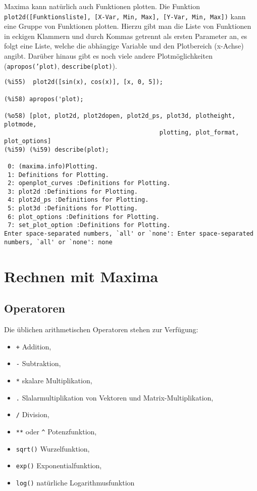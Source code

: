 \documentclass[ngerman,12pt]{scrartcl}
\begin{document}
Maxima kann natürlich auch Funktionen plotten. Die Funktion
\texttt{plot2d([Funktionsliste], [X-Var, Min, Max], [Y-Var, Min,  Max])}
kann eine Gruppe von Funktionen plotten. Hierzu gibt man die
Liste von Funktionen in eckigen Klammern und durch Kommas getrennt als
ersten Parameter an, es folgt eine Liste, welche die abhängige
Variable und den Plotbereich (x-Achse) angibt. Darüber hinaus gibt es
noch viele andere Plotmöglichkeiten (\texttt{apropos('plot)},
\texttt{describe(plot)}).

\begin{verbatim}
(%i55)  plot2d([sin(x), cos(x)], [x, 0, 5]);

(%i58) apropos('plot);

(%o58) [plot, plot2d, plot2dopen, plot2d_ps, plot3d, plotheight, plotmode,
                                           plotting, plot_format, plot_options]
(%i59) (%i59) describe(plot);

 0: (maxima.info)Plotting.
 1: Definitions for Plotting.
 2: openplot_curves :Definitions for Plotting.
 3: plot2d :Definitions for Plotting.
 4: plot2d_ps :Definitions for Plotting.
 5: plot3d :Definitions for Plotting.
 6: plot_options :Definitions for Plotting.
 7: set_plot_option :Definitions for Plotting.
Enter space-separated numbers, `all' or `none': Enter space-separated numbers, `all' or `none': none
\end{verbatim}

\section{Rechnen mit Maxima}

\subsection{Operatoren}

Die üblichen arithmetischen Operatoren stehen zur Verfügung:

\begin{itemize}
\item \texttt{+}  Addition,
\item \texttt{-} Subtraktion,
\item \texttt{*} skalare Multiplikation,
\item \texttt{.} Slalarmultiplikation von Vektoren und Matrix-Multiplikation,
\item \texttt{/} Division,
\item \texttt{**} oder \texttt{\^} Potenzfunktion,
\item \texttt{sqrt()} Wurzelfunktion,
\item \texttt{exp()} Exponentialfunktion,
\item \texttt{log()} natürliche Logarithmusfunktion
\end{itemize}
\end{document}
